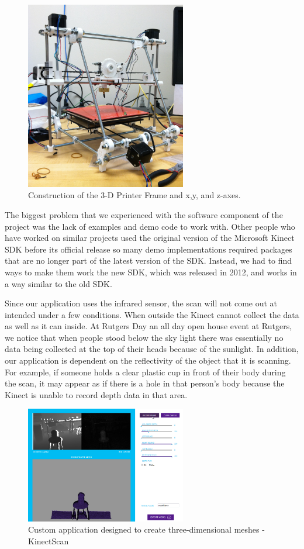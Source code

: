 \documentclass[pdftex,10.5pt]{report}
\begin{document}
\begin{figure}[H]
	\centering
	\includegraphics[width=70mm]{figures/photo.JPG}
	\caption{Construction of the 3-D Printer Frame and x,y, and z-axes.}
	\label{basebuilt}
\end{figure}

The biggest problem that we experienced with the software component of the project was the lack of examples and demo code to work with. Other people who have worked on similar projects used the original version of the Microsoft Kinect SDK before its official release so many demo implementations required packages that are no longer part of the latest version of the SDK. Instead, we had to find ways to make them work the new SDK, which was released in 2012, and works in a way similar to the old SDK.

Since our application uses the infrared sensor, the scan will not come out at intended under a few conditions. When outside the Kinect cannot collect the data as well as it can inside. At Rutgers Day an all day open house event at Rutgers, we notice that when people stood below the sky light there was essentially no data being collected at the top of their heads because of the sunlight. In addition, our application is dependent on the reflectivity of the object that it is scanning. For example, if someone holds a clear plastic cup in front of their body during the scan, it may appear as if there is a hole in that person's body because the Kinect is unable to record depth data in that area.

\begin{figure}[H]
	\centering
	\includegraphics[width=70mm]{figures/KinectScan.jpg}
	\caption{Custom application designed to create three-dimensional meshes - KinectScan}
	\label{kinectscan}
\end{figure}
\end{document}
